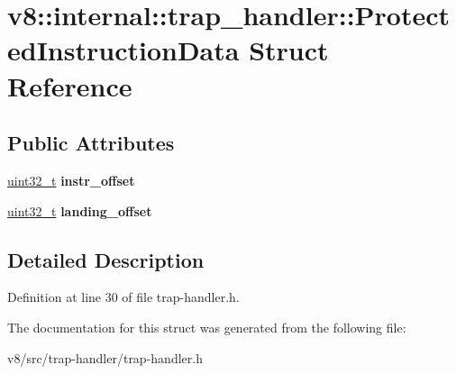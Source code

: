 \hypertarget{structv8_1_1internal_1_1trap__handler_1_1ProtectedInstructionData}{}\section{v8\+:\+:internal\+:\+:trap\+\_\+handler\+:\+:Protected\+Instruction\+Data Struct Reference}
\label{structv8_1_1internal_1_1trap__handler_1_1ProtectedInstructionData}
\subsection*{Public Attributes}
\begin{DoxyCompactItemize}
\item 
\mbox{\label{structv8_1_1internal_1_1trap__handler_1_1ProtectedInstructionData_ad53ed09d9db529dc778705518be5967f}} 
\mbox{\hyperlink{classuint32__t}{uint32\+\_\+t}} {\bfseries instr\+\_\+offset}
\item 
\mbox{\label{structv8_1_1internal_1_1trap__handler_1_1ProtectedInstructionData_a3d4891f18c8eb62b79c3731a63be7090}} 
\mbox{\hyperlink{classuint32__t}{uint32\+\_\+t}} {\bfseries landing\+\_\+offset}
\end{DoxyCompactItemize}


\subsection{Detailed Description}


Definition at line 30 of file trap-\/handler.\+h.



The documentation for this struct was generated from the following file\+:\begin{DoxyCompactItemize}
\item 
v8/src/trap-\/handler/trap-\/handler.\+h\end{DoxyCompactItemize}
